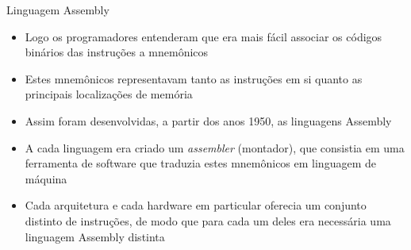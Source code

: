\begin{frame}[fragile]{Linguagem Assembly}

    \begin{itemize}
        \item Logo os programadores entenderam que era mais fácil associar os códigos binários
            das instruções a mnemônicos

        \item Estes mnemônicos representavam tanto as instruções em si quanto as principais 
            localizações de memória

        \item Assim foram desenvolvidas, a partir dos anos 1950, as linguagens Assembly

        \item A cada linguagem era criado um \textit{assembler} (montador), que consistia em 
            uma ferramenta de software que traduzia estes mnemônicos em linguagem de máquina

        \item Cada arquitetura e cada hardware em particular oferecia um conjunto distinto de
            instruções, de modo que para cada um deles era necessária uma linguagem Assembly
            distinta
    \end{itemize}

\end{frame}
